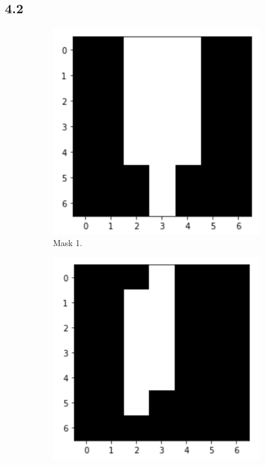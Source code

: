 \subsection*{4.2}
\begin{figure}[H]
	\centering
	\begin{subfigure}[b]{0.45\textwidth}
		\centering
		\includegraphics[width=\textwidth]{Materials/m1res}
		\caption{Mask 1.}
	\end{subfigure}
	\hfill
	\begin{subfigure}[b]{0.45\textwidth}
		\centering
		\includegraphics[width=\textwidth]{Materials/m2res}

\end{subfigure}
\end{figure}
